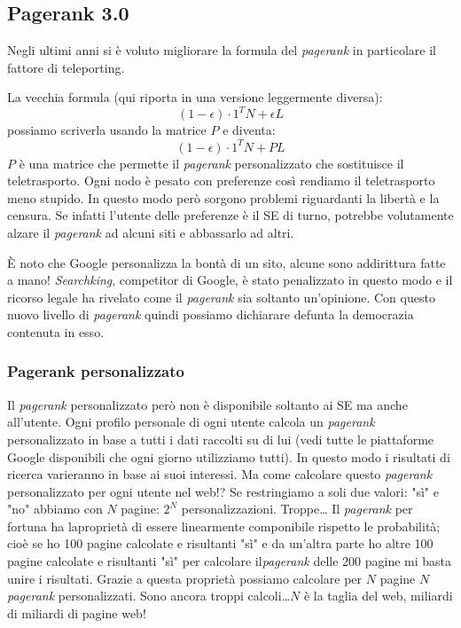 		\subsection{Pagerank 3.0}
			Negli ultimi anni si è voluto migliorare la formula del \emph{pagerank} in particolare il fattore di teleporting.
			
			La vecchia formula (qui riporta in una versione leggermente diversa):
			\[
				(1-\epsilon )\cdot 1^T N + \epsilon L
			\]
			possiamo scriverla usando la matrice $P$ e diventa:
			\[
				(1- \epsilon )\cdot 1^T N + PL
			\]
			$P$ è una matrice che permette il \emph{pagerank} personalizzato che sostituisce il teletrasporto. Ogni nodo è pesato con preferenze così rendiamo il teletrasporto meno stupido. In questo modo però sorgono problemi riguardanti la libertà e la censura. Se infatti l'utente delle preferenze è il SE di turno, potrebbe volutamente alzare il \emph{pagerank} ad alcuni siti e abbassarlo ad altri. 
			
			È noto che Google personalizza la bontà di un sito, alcune sono addirittura fatte a mano! \emph{Searchking}, competitor di Google, è stato penalizzato in questo modo e il ricorso legale ha rivelato come il \emph{pagerank} sia soltanto un'opinione.
			Con questo nuovo livello di \emph{pagerank} quindi possiamo dichiarare defunta la democrazia contenuta in esso.
		
			\subsubsection{Pagerank personalizzato}
			
				Il \emph{pagerank} personalizzato però non è disponibile soltanto ai SE ma anche all'utente. Ogni profilo personale di ogni utente calcola un \emph{pagerank} personalizzato in base a tutti i dati raccolti su di lui (vedi tutte le piattaforme Google disponibili che ogni giorno utilizziamo tutti).  In questo modo i risultati di ricerca varieranno in base ai suoi interessi.
				Ma come calcolare questo \emph{pagerank} personalizzato per ogni utente nel web!? Se restringiamo a soli due valori: "sì" e "no" abbiamo con $N$ pagine: $2^N$ personalizzazioni. Troppe\dots
				Il \emph{pagerank} per fortuna ha laproprietà di essere linearmente componibile rispetto le probabilità; cioè se ho 100 pagine calcolate e risultanti "sì" e da un'altra parte ho altre 100 pagine calcolate e risultanti "sì" per calcolare il\emph{pagerank} delle 200 pagine mi basta unire i risultati. Grazie a questa proprietà possiamo calcolare per $N$ pagine $N$ \emph{pagerank} personalizzati. Sono ancora troppi calcoli\dots $N$ è la taglia del web, miliardi di miliardi di pagine web!
				
